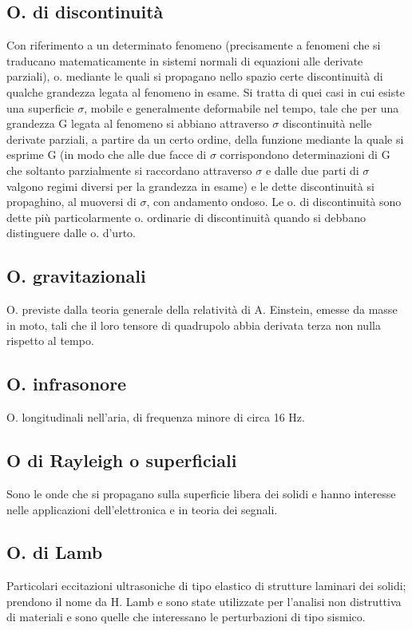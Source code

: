 \documentclass[a4paper]{article}
\begin{document}
\subsection{O. di discontinuità}
Con riferimento a un determinato fenomeno (precisamente a fenomeni che si traducano matematicamente in sistemi normali di equazioni alle derivate parziali), o. mediante le quali si propagano nello spazio certe discontinuità di qualche grandezza legata al fenomeno in esame. Si tratta di quei casi in cui esiste una superficie $\sigma$, mobile e generalmente deformabile nel tempo, tale che per una grandezza G legata al fenomeno si abbiano attraverso $\sigma$ discontinuità nelle derivate parziali, a partire da un certo ordine, della funzione mediante la quale si esprime G (in modo che alle due facce di $\sigma$ corrispondono determinazioni di G che soltanto parzialmente si raccordano attraverso $\sigma$ e dalle due parti di $\sigma$ valgono regimi diversi per la grandezza in esame) e le dette discontinuità si propaghino, al muoversi di $\sigma$, con andamento ondoso. Le o. di discontinuità sono dette più particolarmente o. ordinarie di discontinuità quando si debbano distinguere dalle o. d'urto. 
 
\subsection{O. gravitazionali}
O. previste dalla teoria generale della relatività di A. Einstein, emesse da masse in moto, tali che il loro tensore di quadrupolo abbia derivata terza non nulla rispetto al tempo. 

\subsection{O. infrasonore} 
O. longitudinali nell'aria, di frequenza minore di circa 16 Hz. 

\subsection{O di Rayleigh o superficiali}
Sono le onde che si propagano sulla superficie libera dei solidi e hanno interesse nelle applicazioni dell'elettronica e in teoria dei segnali. 

\subsection{O. di Lamb}
Particolari eccitazioni ultrasoniche di tipo elastico di strutture laminari dei solidi; prendono il nome da H. Lamb e sono state utilizzate per l'analisi non distruttiva di materiali e sono quelle che interessano le perturbazioni di tipo sismico. 
\end{document}
